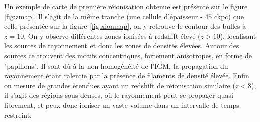 
Un exemple de carte de première réionisation obtenue est présenté sur le figure \ref{fig:zmap}.
Il s'agit de la même tranche (une cellule d’épaisseur - $45$ ckpc) que celle présentée sur la figure \ref{fig:xionmap}, on y retrouve le contour des bulles à $z=10$.
On y observe différentes zones ionisées à redshift élevé ($z>10$), localisant les sources de rayonnement et donc les zones de densités élevées.
Autour des sources ce trouvent des motifs concentriques, fortement anisotropes, en forme de "papillons".
Il sont dû à la non homogénéité de l'\ac{IGM}, la propagation du rayonnement étant ralentie par la présence de filaments de densité élevée.
Enfin on mesure de grandes étendues ayant un redshift de réionisation similaire ($z<8$), il s'agit des régions sous-denses, où le rayonnement peut se propager quasi librement, et peux donc ioniser un vaste volume dans un intervalle de temps restreint.

